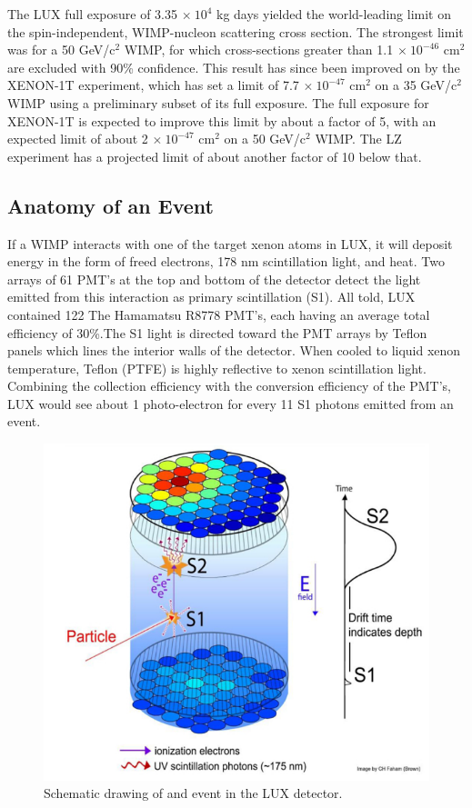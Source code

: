 The LUX full exposure of 3.35 $\times \ 10^4$ kg days yielded the world-leading limit on the spin-independent, WIMP-nucleon scattering cross section. The strongest limit was for a 50 GeV/c$^2$ WIMP, for which cross-sections greater than 1.1 $\times \ 10^{-46}$ cm$^2$ are excluded with 90\% confidence. This result has since been improved on by the XENON-1T experiment, which has set a limit of 7.7 $\times \ 10^{-47}$ cm$^2$ on a 35 GeV/c$^2$ WIMP using a preliminary subset of its full exposure. The full exposure for XENON-1T is expected to improve this limit by about a factor of 5, with an expected limit of about 2 $\times \ 10^{-47}$ cm$^2$ on a 50 GeV/c$^2$ WIMP. The LZ experiment has a projected limit of about another factor of 10 below that.


\subsection{Anatomy of an Event}
If a WIMP interacts with one of the target xenon atoms in LUX, it will deposit energy in the form of freed electrons, 178 nm scintillation light, and heat. Two arrays of 61 PMT's at the top and bottom of the detector detect the light emitted from this interaction as primary scintillation (S1). All told, LUX contained 122 The Hamamatsu R8778 PMT's, each having an average total efficiency of 30\%.The S1 light is directed toward the PMT arrays by Teflon panels which lines the interior walls of the detector. When cooled to liquid xenon temperature, Teflon (PTFE) is highly reflective to xenon scintillation light\cite{ptfe_ref}. Combining the collection efficiency with the conversion efficiency of the PMT's, LUX would see about 1 photo-electron for every 11 S1 photons emitted from an event.
\begin{figure}[!h]
\centering
\includegraphics[width=150mm]{Figures/luxevent.png}
\caption{Schematic drawing of and event in the LUX detector.\cite{lux2012}}
\label{fig:lux} 
\end{figure}

